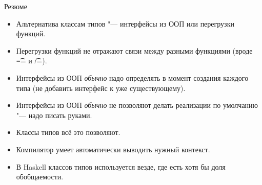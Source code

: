 \begin{frame}[fragile]{Резюме}
	\begin{itemize}
		\item Альтернатива классам типов "--- интерфейсы из ООП или перегрузки функций.
		\item Перегрузки функций не отражают связи между разными функциями (вроде \t{==} и \t{/=}).
		\item Интерфейсы из ООП \textit{обычно} надо определять в момент создания каждого типа (не добавить интерфейс к уже существующему).
		\item Интерфейсы из ООП \textit{обычно} не позволяют делать реализации по умолчанию "--- надо писать руками.
		\item Классы типов всё это позволяют.
		\item Компилятор умеет автоматически выводить нужный контекст.
		\item В Haskell классов типов используется везде, где есть хотя бы доля обобщаемости.
	\end{itemize}
\end{frame}
